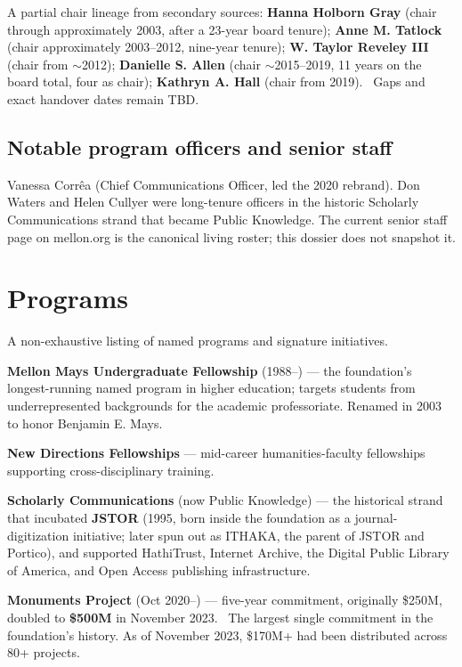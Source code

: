 \documentclass[10pt,letterpaper,twocolumn]{article}
\begin{document}
A partial chair lineage from secondary sources: \textbf{Hanna Holborn Gray} (chair through approximately 2003, after a 23-year board tenure); \textbf{Anne M. Tatlock} (chair approximately 2003--2012, nine-year tenure); \textbf{W. Taylor Reveley III} (chair from $\sim$2012); \textbf{Danielle S. Allen} (chair $\sim$2015--2019, 11 years on the board total, four as chair); \textbf{Kathryn A. Hall} (chair from 2019).~\citep{mellonprnewswire2019} Gaps and exact handover dates remain TBD.

\subsection{Notable program officers and senior staff}

Vanessa Corr\^ea (Chief Communications Officer, led the 2020 rebrand). Don Waters and Helen Cullyer were long-tenure officers in the historic Scholarly Communications strand that became Public Knowledge. The current senior staff page on mellon.org is the canonical living roster; this dossier does not snapshot it.

\section{Programs}

A non-exhaustive listing of named programs and signature initiatives.

\textbf{Mellon Mays Undergraduate Fellowship} (1988--) --- the foundation's longest-running named program in higher education; targets students from underrepresented backgrounds for the academic professoriate. Renamed in 2003 to honor Benjamin E. Mays.

\textbf{New Directions Fellowships} --- mid-career humanities-faculty fellowships supporting cross-disciplinary training.

\textbf{Scholarly Communications} (now Public Knowledge) --- the historical strand that incubated \textbf{JSTOR} (1995, born inside the foundation as a journal-digitization initiative; later spun out as ITHAKA, the parent of JSTOR and Portico), and supported HathiTrust, Internet Archive, the Digital Public Library of America, and Open Access publishing infrastructure.

\textbf{Monuments Project} (Oct 2020--) --- five-year commitment, originally \$250M, doubled to \textbf{\$500M} in November 2023.~\citep{mellonmonuments,nprmonuments2023} The largest single commitment in the foundation's history. As of November 2023, \$170M+ had been distributed across 80+ projects.~\citep{mellonmonuments}
\end{document}
